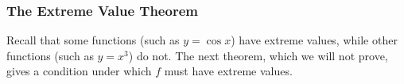 \begin{frame}
\frametitle{The Extreme Value Theorem}
Recall that some functions (such as $y = \cos x$) have extreme values, while other functions (such as $y = x^3$) do not.  The next theorem, which we will not prove, gives a condition under which $f$ must have extreme values.
\end{frame}
